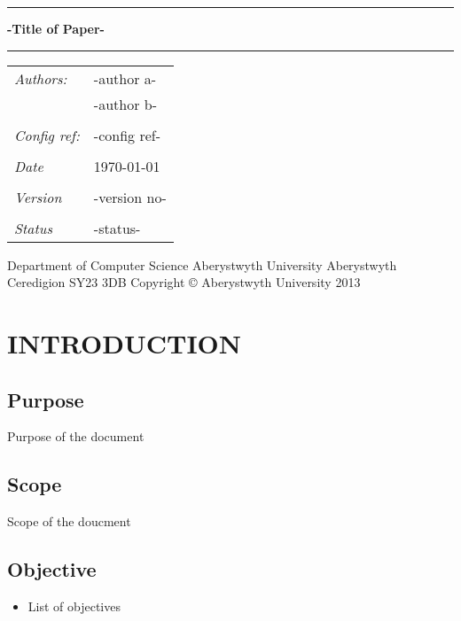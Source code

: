\documentclass[12pt]{article}
\begin{document}
\pagestyle{fancy}
\begin{flushleft}
\rule[0.5cm]{13.8cm}{0.1cm}
\end{flushleft}
{\fontsize{20}{20}\selectfont \textbf {-Title of Paper-}}
\begin{flushleft}
\rule[0.5cm]{13.8cm}{0.1cm}
\end{flushleft}

\begin{tabular}{ l l }

\\ \multirow{1}{*}{\textit{Authors: }} & -author a-   \\  & -author b- \\
\\ \multirow{1}{*}{\textit{Config ref: }} & -config ref- \\
\\ \multirow{1}{*}{\textit{Date} } & \today \\
\\ \multirow{1}{*}{\textit{Version}} & -version no-  \\ 
\\ \multirow{1}{*}{\textit{Status}} & -status- \\

\end{tabular}


\vspace{5cm}
\setlength{\parindent}{0pt} %
Department of Computer Science\newline
Aberystwyth University \newline
Aberystwyth \newline
Ceredigion\newline
SY23 3DB \newline
Copyright \small{\copyright} Aberystwyth University 2013
\setlength{\parindent}{12pt} %


\newpage
\tableofcontents{}
\newpage
\section{INTRODUCTION}
\subsection{Purpose}
Purpose of the document
\subsection{Scope}
Scope of the doucment
\subsection{Objective}
\begin{itemize}
\item List of objectives
\end{itemize}
\end{document}
